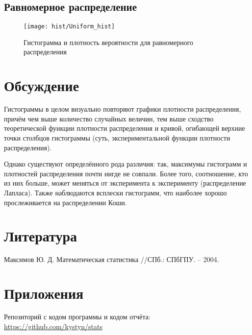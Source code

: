 \subsection{Равномерное распределение}
\begin{figure}[H]
	\begin{center}
		\texttt{[image: hist/Uniform\_hist]}
		\caption{Гистограмма и плотность вероятности для равномерного распределения} 
		\label{pic:pic_name}
	\end{center}
\end{figure}


\section{Обсуждение}
Гистограммы в целом визуально повторяют графики плотности распределения, причём чем выше количество случайных величин, тем выше сходство теоретической функции плотности распределения и кривой, огибающей верхние точки столбцов гистограммы (суть, экспериментальной функции плотности распределения).

Однако существуют определённого рода различия: так, максимумы гистограмм и плотностей распределения почти нигде не совпали. Более того, соотношение, кто из них больше, может меняться от эксперимента к эксперименту (распределение Лапласа). Также наблюдаются всплески гистограмм, что наиболее хорошо прослеживается на распределении Коши.



\section{Литература}
Максимов Ю. Д. Математическая статистика //СПб.: СПбГПУ. – 2004.

\section{Приложения}

Репозиторий с кодом программы и кодом отчёта: \href{https://github.com/kystyn/stats}{https://github.com/kystyn/stats}



